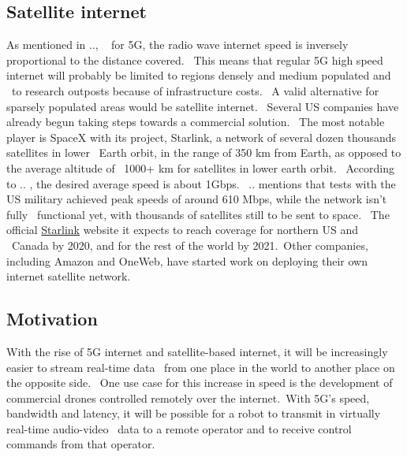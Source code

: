 \subsection{Satellite internet}
\label{subsec:satellite-internet}
As mentioned in .., \ %
for 5G, the radio wave internet speed is inversely proportional to the distance covered. \
This means that regular 5G high speed internet will probably be limited to regions densely and medium populated and \
to research outposts because of infrastructure costs. \
A valid alternative for sparsely populated areas would be satellite internet. \
Several US companies have already begun taking steps towards a commercial solution. \
The most notable player is SpaceX with its project, Starlink, a network of several dozen thousands satellites in lower \
Earth orbit, in the range of 350 km from Earth, as opposed to the average altitude of \
1000+ km for satellites in lower earth orbit. \
According to .. , %
the desired average speed is about 1Gbps. \
 .. %
mentions that tests with the US military achieved peak speeds of around 610 Mbps, while the network isn't fully \
functional yet, with thousands of satellites still to be sent to space. \
The official \href{https://www.starlink.com/}{Starlink} website it expects to reach coverage for northern US and \
Canada by 2020, and for the rest of the world by 2021.\
Other companies, including Amazon and OneWeb, have started work on deploying their own internet satellite network.

\subsection{Motivation}
\label{subsec:introduction-motivation}
With the rise of 5G internet and satellite-based internet, it will be increasingly easier to stream real-time data \
from one place in the world to another place on the opposite side. \
One use case for this increase in speed is the development of commercial drones controlled remotely over the internet.\
With 5G's speed, bandwidth and latency, it will be possible for a robot to transmit in virtually real-time audio-video \
data to a remote operator and to receive control commands from that operator.


